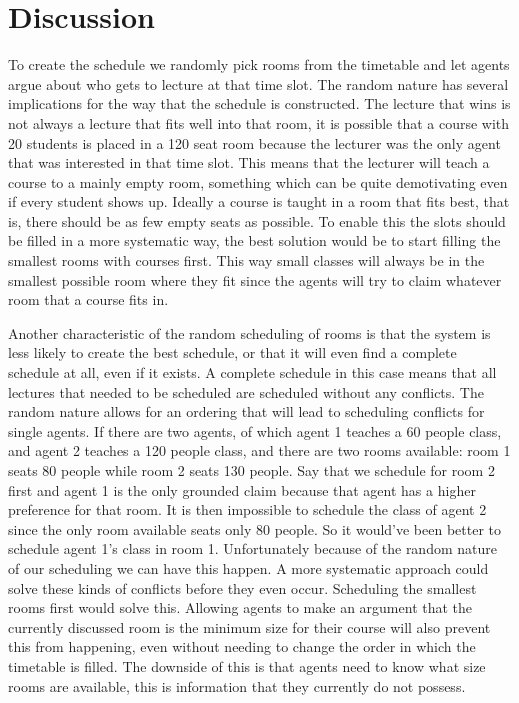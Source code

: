 \section{Discussion}
To create the schedule we randomly pick rooms from the timetable and let agents
argue about who gets to lecture at that time slot. The random nature has several
implications for the way that the schedule is constructed. The lecture that wins
is not always a lecture that fits well into that room, it is possible that a
course with 20 students is placed in a 120 seat room because the lecturer was
the only agent that was interested in that time slot. This means that the
lecturer will teach a course to a mainly empty room, something which can be
quite demotivating even if every student shows up. Ideally a course is taught in
a room that fits best, that is, there should be as few empty seats as possible.
To enable this the slots should be filled in a more systematic way, the best
solution would be to start filling the smallest rooms with courses first. This
way small classes will always be in the smallest possible room where they fit
since the agents will try to claim whatever room that a course fits in.

Another characteristic of the random scheduling of rooms is that the system is
less likely to create the best schedule, or that it will even find a complete
schedule at all, even if it exists. A complete schedule in this case means that
all lectures that needed to be scheduled are scheduled without any conflicts.
The random nature allows for an ordering that will lead to scheduling conflicts
for single agents. If there are two agents, of which agent 1 teaches a 60 people
class, and agent 2 teaches a 120 people class, and there are two rooms
available: room 1 seats 80 people while room 2 seats 130 people. Say that we
schedule for room 2 first and agent 1 is the only grounded claim because that
agent has a higher preference for that room. It is then impossible to schedule
the class of agent 2 since the only room available seats only 80 people. So it
would've been better to schedule agent 1's class in room 1. Unfortunately
because of the random nature of our scheduling we can have this happen. A more
systematic approach could solve these kinds of conflicts before they even occur.
Scheduling the smallest rooms first would solve this. Allowing agents to make
an argument that the currently discussed room is the minimum size for their
course will also prevent this from happening, even without needing to change the
order in which the timetable is filled. The downside of this is that agents need
to know what size rooms are available, this is information that they currently
do not possess.

